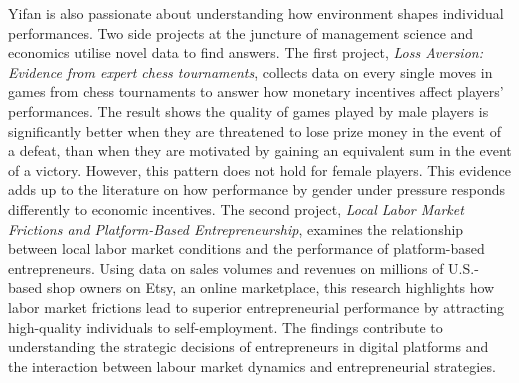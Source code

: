 \documentclass[12pt, letterpaper]{article}
\begin{document}
Yifan is also passionate about understanding how environment shapes individual performances. Two side projects at the juncture of management science and economics utilise novel data to find answers. The first project, \textit{Loss Aversion: Evidence from expert chess tournaments}, collects data on every single moves in games from chess tournaments to answer how monetary incentives affect players' performances. The result shows the quality of games played by male players is significantly better when they are threatened to lose prize money in the event of a defeat, than when they are motivated by gaining an equivalent sum in the event of a victory. However, this pattern does not hold for female players. This evidence adds up to the literature on how performance by gender under pressure responds differently to economic incentives. The second project, \textit{Local Labor Market Frictions and Platform-Based Entrepreneurship}, examines the relationship between local labor market conditions and the performance of platform-based entrepreneurs. Using data on sales volumes and revenues on millions of U.S.-based shop owners on Etsy, an online marketplace, this research highlights how labor market frictions lead to superior entrepreneurial performance by attracting high-quality individuals to self-employment. The findings contribute to understanding the strategic decisions of entrepreneurs in digital platforms and the interaction between labour market dynamics and entrepreneurial strategies.

\clearpage



\end{document}
